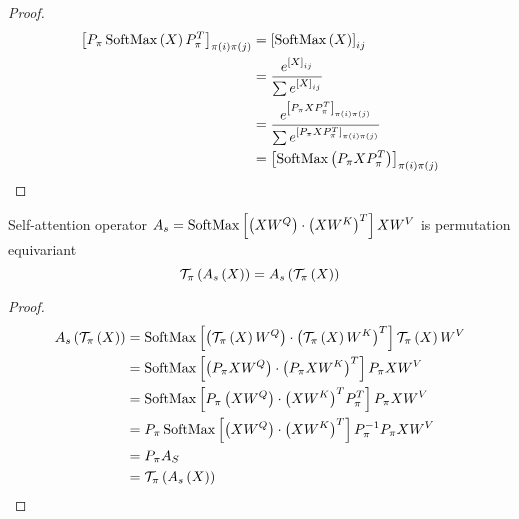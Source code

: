 \begin{proof}
    \begin{align*}
        {\left[P_{\pi}\operatorname{SoftMax}\left(X\right)P_{\pi}^T\right]}_{\pi(i)\pi(j)} & = {\left[\operatorname{SoftMax}\left(X\right)\right]}_{ij}                                                                           \\
                                                                             & = \frac{e^{{\left[X\right]}_{ij}}}{\sum e^{{\left[X\right]}_{ij}}}                                                     \\
                                                                             & = \frac{e^{{\left[P_{\pi}XP_{\pi}^T\right]}_{\pi(i)\pi(j)}}}{\sum e^{{\left[P_{\pi}XP_{\pi}^T\right]}_{\pi(i)\pi(j)}}} \\
                                                                             & = {\left[\operatorname{SoftMax}\left(P_{\pi}XP_{\pi}^T\right)\right]}_{\pi(i)\pi(j)}
    \end{align*}
\end{proof}

\begin{theorem}
    Self-attention operator \(A_s = \operatorname{SoftMax}\left[\left(XW^Q\right)\cdot{\left(XW^K\right)}^T \right]XW^V\) is permutation equivariant
    \[\mathcal{T}_{\pi}\left(A_s\left(X\right)\right) = A_s\left(\mathcal{T}_{\pi}\left(X\right)\right)\]
\end{theorem}

\begin{proof}
    \begin{align*}
        A_s\left(\mathcal{T}_{\pi}\left(X\right)\right) & = \operatorname{SoftMax}\left[ \left( \mathcal{T}_{\pi}\left(X\right)W^Q\right) \cdot {\left(\ensuremath{\mathcal{T}_{\pi}}\left(X\right)W^K\right)}^T \right] \mathcal{T}_{\pi}\left(X\right)W^V \\
                                             & = \operatorname{SoftMax}\left[ \left(P_{\pi}XW^Q\right)\cdot{\left(P_{\pi}XW^K\right)}^T  \right]P_{\pi}XW^V                                        \\
                                             & = \operatorname{SoftMax}\left[ P_{\pi}\left(XW^Q\right)\cdot{\left(XW^K\right)}^T P_{\pi}^T  \right]P_{\pi}XW^V                                     \\
                                             & = P_{\pi}\operatorname{SoftMax}\left[ \left(XW^Q\right)\cdot{\left(XW^K\right)}^T\right]P_{\pi}^{-1}P_{\pi}XW^V                                     \\
                                             & = P_{\pi}A_S                                                                                                                          \\
                                             & = \mathcal{T}_{\pi}\left(A_s\left(X\right)\right)
    \end{align*}
\end{proof}
